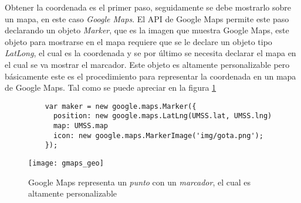     Obtener la coordenada es el primer paso, seguidamente se debe mostrarlo sobre un mapa, en este caso \emph{Google Maps}. El API de Google Maps permite este paso declarando un objeto \emph{Marker}, que es la imagen que muestra Google Maps, este objeto para mostrarse en el mapa requiere que se le declare un objeto tipo \emph{LatLong}, el cual es la coordenada y se por \'ultimo se necesita declarar el mapa en el cual se va mostrar el marcador. Este objeto es altamente personalizable pero b\'asicamente este es el procedimiento para representar la coordenada en un mapa de Google Maps. Tal como se puede apreciar en la figura \ref{fig:gmaps_geo}\\

    \begin{figure}[!htp]
    \label{fig:gmaps_geo}
  \begin{verbatim}
    var maker = new google.maps.Marker({
      position: new google.maps.LatLng(UMSS.lat, UMSS.lng)
      map: UMSS.map
      icon: new google.maps.MarkerImage('img/gota.png');
    });
  \end{verbatim}

          \begin{center}
            \texttt{[image: gmaps\_geo]}
          \end{center}
          \caption[Google Maps - Marker]{Google Maps representa un \emph{punto} con un \emph{marcador}, el cual es altamente personalizable } 
    \end{figure}










